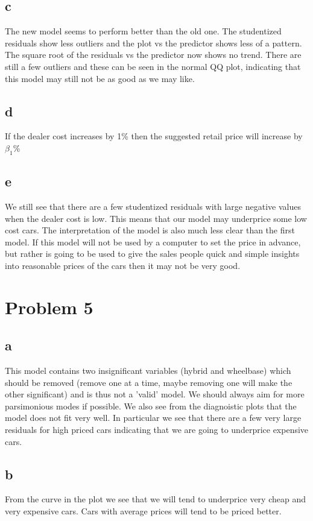 \documentclass{article}\usepackage[]{graphicx}\usepackage[]{color}
\begin{document}
\subsection*{c}
The new model seems to perform better than the old one. The studentized residuals show less outliers and the plot vs the predictor shows less of a pattern. The square root of the residuals vs the predictor now shows no trend. There are still a few outliers and these can be seen in the normal QQ plot, indicating that this model may still not be as good as we may like.
\subsection*{d}
If the dealer cost increases by 1\% then the suggested retail price will increase by $\beta_1$\%
\subsection*{e}
We still see that there are a few studentized residuals with large negative values when the dealer cost is low. This means that our model may underprice some low cost cars. The interpretation of the model is also much less clear than the first model. If this model will not be used by a computer to set the price in advance, but rather is going to be used to give the sales people quick and simple insights into reasonable prices of the cars then it may not be very good.

\section*{Problem 5}

\subsection*{a}
This model contains two insignificant variables (hybrid and wheelbase) which should be removed (remove one at a time, maybe removing one will make the other significant) and is thus not a 'valid' model. We should always aim for more parsimonious modes if possible. We also see from the diagnoistic plots that the model does not fit very well. In particular we see that there are a few very large residuals for high priced cars indicating that we are going to underprice expensive cars.
\subsection*{b}
From the curve in the plot we see that we will tend to underprice very cheap and very expensive cars. Cars with average prices will tend to be priced better.
\end{document}
